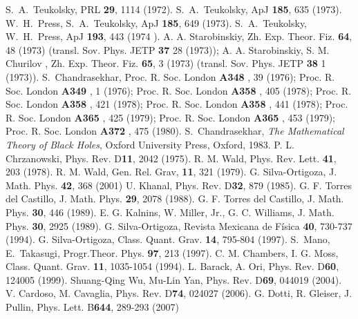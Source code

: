 \documentclass[prd,aps,twocolumn,leterpaper,preprintnumbers]{revtex4}
\numberwithin{equation}{section}
\begin{document}
\begin{thebibliography}{}
%
 S.~A.~Teukolsky, PRL {\bf 29}, 1114 (1972).
                    S.~A.~Teukolsky, ApJ {\bf 185}, 635 (1973).
                    W.~H.~Press, S.~A.~Teukolsky, ApJ {\bf 185}, 649 (1973).
                    S.~A.~Teukolsky, W.~H.~Press, ApJ {\bf 193}, 443 (1974 ).
%
 A. A. Starobinskiy, Zh. Exp. Theor. Fiz. {\bf 64}, 48 (1973) (transl. Sov. Phys. JETP {\bf 37} 28 (1973));
                      A. A. Starobinskiy, S. M. Churilov ,  Zh. Exp. Theor. Fiz. {\bf 65}, 3 (1973) (transl. Sov. Phys. JETP {\bf 38} 1 (1973)).
%
   S.~Chandrasekhar,  Proc. R. Soc. London {\bf A348 }, 39 (1976);
                    Proc. R. Soc. London {\bf A349 }, 1  (1976);
                    Proc. R. Soc. London {\bf A358 }, 405 (1978);
                    Proc. R. Soc. London {\bf A358 }, 421 (1978);
                    Proc. R. Soc. London {\bf A358 }, 441 (1978);
                    Proc. R. Soc. London {\bf A365 }, 425 (1979);
                    Proc. R. Soc. London {\bf A365 }, 453 (1979);
                    Proc. R. Soc. London {\bf A372 }, 475 (1980).
%
   S.~Chandrasekhar,  {\em The Mathematical Theory of Black
                    Holes}, Oxford University Press, Oxford, 1983.
%
     P. L. Chrzanowski, Phys. Rev. D{\bf 11}, 2042 (1975).
                    R. M. Wald, Phys. Rev. Lett. {\bf 41}, 203 (1978).
                    R. M. Wald, Gen. Rel. Grav, {\bf 11}, 321 (1979).
                    G. Silva-Ortigoza, J. Math. Phys. {\bf 42}, 368 (2001)
%
       U. Khanal, Phys. Rev. D{\bf 32}, 879 (1985).
                    G. F. Torres del Castillo, J. Math. Phys. {\bf 29}, 2078 (1988).
                    G. F. Torres del Castillo, J. Math. Phys. {\bf 30}, 446 (1989).
                    E. G. Kalnins, W. Miller, Jr., G. C. Williams, J. Math. Phys. {\bf 30}, 2925 (1989).
                    G. Silva-Ortigoza, Revista Mexicana de F\'isica {\bf 40}, 730-737  (1994).
                    G. Silva-Ortigoza,  Class. Quant. Grav. {\bf 14},  795-804 (1997).
                    S.~Mano, E.~Takasugi, Progr.Theor. Phys. {\bf 97}, 213 (1997).
%
  C. M. Chambers, I. G. Moss, Class. Quant. Grav. {\bf 11}, 1035-1054 (1994).
                           L. Barack, A. Ori, Phys. Rev. D{\bf 60}, 124005 (1999).
                           Shuang-Qing Wu, Mu-Lin Yan, Phys. Rev. D{\bf 69}, 044019 (2004).
%
    V. Cardoso, M. Cavaglia, Phys. Rev. D{\bf 74}, 024027 (2006).
                  G. Dotti, R. Gleiser, J. Pullin, Phys. Lett. B{\bf 644}, 289-293 (2007)

\end{thebibliography}
\end{document}
